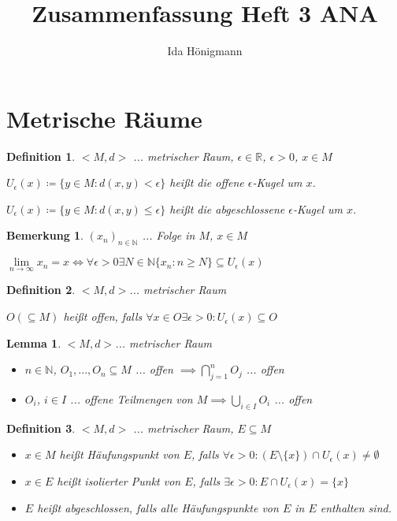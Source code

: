 \documentclass[twocolumn]{article}
\title{Zusammenfassung Heft 3 ANA}
\author{Ida Hönigmann}
\newtheorem{lemma}[theorem]{Lemma}
\newtheorem{definition}{Definition}[section]
\newtheorem*{remark}{Bemerkung}
\newcommand*{\logeq}{\Leftrightarrow}
\begin{document}
	
\maketitle

\section{Metrische Räume}

\begin{definition}
	$<M,d>$ ... metrischer Raum, $\epsilon \in \mathbb{R}$, $\epsilon > 0$, $x \in M$
	
	$U_\epsilon(x)\coloneqq \{y \in M : d(x,y) < \epsilon\}$ heißt die offene $\epsilon$-Kugel um $x$.

	$U_\epsilon(x)\coloneqq \{y \in M : d(x,y) \leq \epsilon\}$ heißt die abgeschlossene $\epsilon$-Kugel um $x$.

\end{definition}

\begin{remark}
	$(x_n)_{n \in \mathbb{N}}$ ... Folge in $M$, $x \in M$
	
	$\lim\limits_{n\rightarrow \infty}x_n = x \logeq \forall \epsilon > 0 \exists N \in \mathbb{N} \{x_n:n\geq N\} \subseteq U_\epsilon(x)$
\end{remark}

\begin{definition}
	$<M,d>$... metrischer Raum
	
	$O(\subseteq M)$ heißt offen, falls $\forall x \in O \exists \epsilon > 0: U_{\epsilon}(x)\subseteq O$
\end{definition}

\begin{lemma}
	$<M,d>$... metrischer Raum
	
	\begin{itemize}
		\item $n \in \mathbb{N}$, $O_1,...,O_n \subseteq M$ ... offen $ \implies \bigcap_{j=1}^{n}O_j$ ... offen
		\item $O_i$, $i \in I$ ... offene Teilmengen von $M \implies \bigcup_{i \in I}O_i$ ... offen
	\end{itemize}
\end{lemma}

\begin{definition}
	$<M,d>$ ... metrischer Raum, $E \subseteq M$
	
	\begin{itemize}
		\item $x \in M$ heißt Häufungspunkt von $E$, falls $\forall \epsilon > 0: (E\setminus \{x\})\cap U_{\epsilon}(x)\neq \emptyset$
		\item $x \in E$ heißt isolierter Punkt von $E$, falls $\exists \epsilon > 0 : E \cap U_{\epsilon}(x)=\{x\}$
		\item $E$ heißt abgeschlossen, falls alle Häufungspunkte von $E$ in $E$ enthalten sind.
	\end{itemize}
\end{definition}
\end{document}
